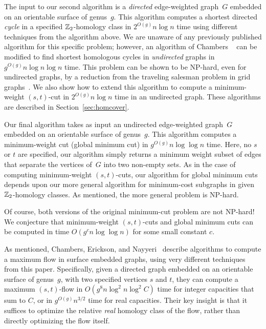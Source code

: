 The input to our second algorithm is a \emph{directed} edge-weighted graph~$G$ embedded on an orientable surface of genus~$g$.
This algorithm computes a shortest directed \emph{cycle} in a specified $\mathbb{Z}_2$-homology class in $2^{O(g)}n\log n$ time using different techniques from the algorithm above.
We are unaware of any previously published algorithm for this specific problem; however, an algorithm of Chambers \etal~\cite{ccelw-scsih-08} can be modified to find shortest homologous cycles in \emph{undirected} graphs in $g^{O(g)} n\log n \log n$ time.
This problem can be shown to be {NP}-hard, even for undirected graphs, by a reduction from the traveling salesman problem in grid graphs~\cite{ccelw-scsih-08}.
We also show how to extend this algorithm to compute a minimum-weight $(s,t)$-cut in $2^{O(g)}n\log n$ time in an undirected graph.
These algorithms are described in Section~\ref{sec:homcover}.

Our final algorithm takes as input an undirected edge-weighted graph~$G$ embedded on an orientable surface of genus~$g$.
This algorithm computes a minimum-weight cut (global minimum cut) in $g^{O(g)}n\log \log n$ time.
Here, no $s$ or $t$ are specified, our algorithm simply returns a minimum weight subset of edges that separate the vertices of~$G$ into two non-empty sets.
As in the case of computing minimum-weight $(s,t)$-cuts, our algorithm for global minimum cuts depends upon our more general algorithm for minimum-cost subgraphs in given $\mathbb{Z}_2$-homology classes.
As mentioned, the more general problem is NP-hard.

Of course, both versions of the original minimum-cut problem are not NP-hard!
We conjecture that minimum-weight $(s,t)$-cuts and global minimum cuts can be computed in time $O(g^c n\log \log n)$ for some small constant $c$.

As mentioned, Chambers, Erickson, and Nayyeri~\cite{cen-hfcc-12} describe algorithms to compute a maximum flow in surface embedded graphs, using very different techniques from this paper.  Specifically, given a directed graph embedded on an orientable surface of genus~$g$, with two specified vertices $s$ and $t$, they can compute a maximum $(s,t)$-flow in $O(g^8 n\log^2 n\log^2 C)$ time for integer capacities that sum to $C$, or in $g^{O(g)}n^{3/2}$ time for real capacities.  Their key insight is that it suffices to optimize the relative \emph{real} homology class of the flow, rather than directly optimizing the flow itself.
